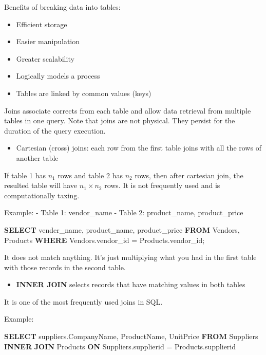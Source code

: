 \documentclass[]{book}
\newenvironment{Shaded}{\begin{snugshade}}{\end{snugshade}}
\newcommand{\KeywordTok}[1]{\textcolor[rgb]{0.13,0.29,0.53}{\textbf{{#1}}}}
\newcommand{\NormalTok}[1]{{#1}}
\providecommand{\tightlist}{%
  \setlength{\itemsep}{0pt}\setlength{\parskip}{0pt}}
\theoremstyle{definition}
\theoremstyle{definition}
\theoremstyle{remark}
\begin{document}
Benefits of breaking data into tables:

\begin{itemize}
\tightlist
\item
  Efficient storage
\item
  Easier manipulation
\item
  Greater scalability
\item
  Logically models a process
\item
  Tables are linked by common values (keys)
\end{itemize}

Joins associate corrects from each table and allow data retrieval from
multiple tables in one query. Note that joins are not physical. They
persist for the duration of the query execution.

\begin{itemize}
\tightlist
\item
  Cartesian (cross) joins: each row from the first table joins with all
  the rows of another table
\end{itemize}

If table 1 has \(n_1\) rows and table 2 has \(n_2\) rows, then after
cartesian join, the resulted table will have \(n_1 \times n_2\) rows. It
is not frequently used and is computationally taxing.

Example: - Table 1: vendor\_name - Table 2: product\_name,
product\_price

\begin{Shaded}
\begin{Highlighting}[]
\KeywordTok{SELECT} \NormalTok{vender_name, product_name, product_price}
\KeywordTok{FROM} \NormalTok{Vendors, Products}
\KeywordTok{WHERE} \NormalTok{Vendors.vendor_id = Products.vendor_id;}
\end{Highlighting}
\end{Shaded}

It does not match anything. It's just multiplying what you had in the
first table with those records in the second table.

\begin{itemize}
\tightlist
\item
  \textbf{INNER JOIN} selects records that have matching values in both
  tables
\end{itemize}

It is one of the most frequently used joins in SQL.

Example:

\begin{Shaded}
\begin{Highlighting}[]
\KeywordTok{SELECT} \NormalTok{suppliers.CompanyName, ProductName, UnitPrice}
\KeywordTok{FROM} \NormalTok{Suppliers }\KeywordTok{INNER} \KeywordTok{JOIN} \NormalTok{Products }
\KeywordTok{ON} \NormalTok{Suppliers.supplierid = Products.supplierid}
\end{Highlighting}
\end{Shaded}
\end{document}
